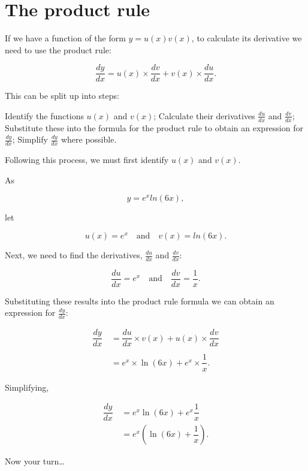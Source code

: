 \documentclass[
  a4paper,
]{scrbook}
\begin{document}
\hypertarget{the-product-rule}{%
\section{The product rule}\label{the-product-rule}}

If we have a function of the form \(y=u(x)v(x)\), to calculate its
derivative we need to use the product rule:

\[
\dfrac{dy}{dx} = u(x) \times \dfrac{dv}{dx} + v(x) \times\dfrac{du}{dx}.
\]

This can be split up into steps:

Identify the functions \(u(x)\) and \(v(x)\); Calculate their
derivatives \(\tfrac{du}{dx}\) and \(\tfrac{dv}{dx}\); Substitute these
into the formula for the product rule to obtain an expression for
\(\tfrac{dy}{dx}\); Simplify \(\tfrac{dy}{dx}\) where possible.

Following this process, we must first identify \(u(x)\) and \(v(x)\).

As

\[
y=e^x ln(6x),
\]

let

\[
u(x) = e^x \quad \text{and} \quad v(x)=ln(6x).
\]

Next, we need to find the derivatives, \(\tfrac{du}{dx}\) and
\(\tfrac{dv}{dx}\):

\[
\dfrac{du}{dx} = e^x\quad \text{and} \quad\dfrac{dv}{dx}=\dfrac{1}{x}.
\]

Substituting these results into the product rule formula we can obtain
an expression for \(\tfrac{dy}{dx}\):

\[
\begin{aligned}
\dfrac{dy}{dx} &\,= \dfrac{du}{dx}\times v(x) + u(x) \times\dfrac{dv}{dx} \\ \\
&\,=e^x \times\ln(6x) +e^x \times \dfrac{1}{x}. 
\end{aligned}
\]

Simplifying,

\[
\begin{aligned}
\dfrac{dy}{dx} &\,= e^x\ln(6x) +e^x \dfrac{1}{x} \\ 
&\,= e^x (\ln(6x) +\dfrac{1}{x}).
\end{aligned}
\]

Now your turn\ldots{}
\end{document}
